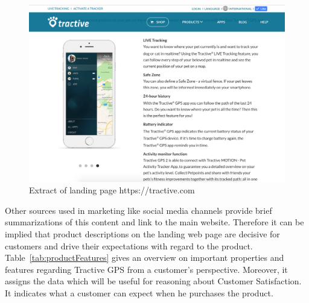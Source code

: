\begin{figure}
	\centering
	\includegraphics[width=1.0\textwidth]{img/tractiveLanding.png}
	\caption{Extract of landing page https://tractive.com}
	\label{fig:tractiveLanding}
\end{figure} 

Other sources used in marketing like social media channels provide brief summarizations of this content and link to the main website. Therefore it can be implied that product descriptions on the landing web page are decisive for customers and drive their expectations with regard to the product. Table~\ref{tab:productFeatures} gives an overview on important properties and features regarding Tractive GPS from a customer's perspective. Moreover, it assigns the data which will be useful for reasoning about Customer Satisfaction. It indicates what a customer can expect when he purchases the product.


